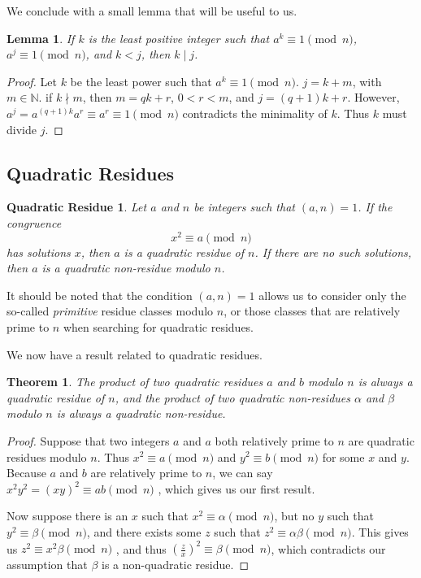 \documentclass{article}
\newtheorem*{theorem}{Theorem}
\newtheorem*{lemma}{Lemma}
\begin{document}
We conclude with a small lemma that will be useful to us.
\begin{lemma}
If $k$ is the least positive integer such that $a^k \equiv 1 \pmod n$, $a^j \equiv 1 \pmod n$, and $k < j$, then $k \mid j$.
\end{lemma}
\begin{proof}
Let $k$ be the least power such that $a^k \equiv 1 \pmod n$. $j = k + m$, with $m \in \mathbb N$. if $k \nmid m$, then $m = qk+ r$, $ 0 < r < m$, and $j = (q+1)k + r$. However, $a^j = a^{(q+1)k}a^r \equiv a^r \equiv 1 \pmod n$ contradicts the minimality of $k$. Thus $k$ must divide $j$.
\end{proof}
\subsection*{Quadratic Residues}
\newtheorem*{quadraticresiduedefinition}{Quadratic Residue}
\begin{quadraticresiduedefinition}
Let $a$ and $n$ be integers such that $(a,n) = 1$. If the congruence
	$$x^2 \equiv a \pmod n$$
has solutions $x$, then $a$ is a \textit{quadratic residue} of $n$. If there are no such solutions, then $a$ is a \textit{quadratic non-residue} modulo $n$.
\end{quadraticresiduedefinition}

\par It should be noted that the condition $(a,n) = 1$ allows us to consider only the so-called \textit{primitive} residue classes modulo $n$, or those classes that are relatively prime to $n$ when searching for quadratic residues. 

\par We now have a result related to quadratic residues.
 \begin{theorem}
 The product of two quadratic residues $a$ and $b$ modulo $n$ is always a quadratic residue of $n$, and the product of two quadratic non-residues $\alpha$ and $\beta$ modulo $n$ is always a quadratic non-residue.
 \end{theorem}
 \begin{proof}
 Suppose that two integers $a$ and $a$ both relatively prime to $n$ are quadratic residues modulo $n$. Thus $x^2 \equiv a
  \pmod n$ and $y^2 \equiv b \pmod n$ for some $x$ and $y$. Because $a$ and $b$ are relatively prime to $n$, we can say
   $x^2y^2 = (xy)^2 \equiv ab \pmod n$ , which gives us our first result.
 \par Now suppose there is an $x$ such that  $x^2 \equiv \alpha \pmod n$, but no $y$ such that  $y^2 \equiv \beta \pmod n$,
  and there exists some $z$ such that $z^2 \equiv \alpha\beta \pmod n$. This gives us $z^2 \equiv x^2 \beta \pmod n$ , and thus 
  $\left( \frac{z}{x} \right)^2 \equiv \beta \pmod n$, which contradicts our assumption that $\beta$ is a non-quadratic residue.
 \end{proof}
 
\end{document}
